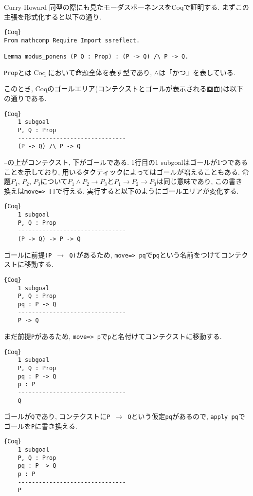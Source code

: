 \documentclass[11pt]{jsreport}
\theoremstyle{mystyle}
\newcommand{\0}{\textbf{0}}
\begin{document}
Curry-Howard 同型の際にも見たモーダスポーネンスをCoqで証明する. 
まずこの主張を形式化すると以下の通り. 
\begin{lstlisting}{Coq}
From mathcomp Require Import ssreflect.

Lemma modus_ponens (P Q : Prop) : (P -> Q) /\ P -> Q. \end{lstlisting}
{\tt Prop}とは Coq において命題全体を表す型であり, {\tt $\wedge$}は「かつ」を表している. 

このとき, Coqのゴールエリア(コンテクストとゴールが表示される画面)は以下の通りである. 
\begin{screen}
  \begin{lstlisting}{Coq}
    1 subgoal
    P, Q : Prop
    -------------------------------
    (P -> Q) /\ P -> Q \end{lstlisting}
\end{screen}
{\tt ---}の上がコンテクスト, 下がゴ－ルである. 1行目の{1 subgoal}はゴールが1つであることを示しており, 用いるタクティックによってはゴールが増えることもある. 
命題$P_1$, $P_2$, $P_3$について$P_1 \wedge P_2 \to P_3$と$P_1 \to P_2 \to P_3$は同じ意味であり, この書き換えは{\tt move=> []}で行える. 実行すると以下のようにゴールエリアが変化する. 
\begin{screen}
  \begin{lstlisting}{Coq}
    1 subgoal
    P, Q : Prop
    -------------------------------
    (P -> Q) -> P -> Q \end{lstlisting}
\end{screen}
ゴールに前提{\tt (P $\to$ Q)}があるため, {\tt move=> pq}で{\tt pq}という名前をつけてコンテクストに移動する. 
\begin{screen}
  \begin{lstlisting}{Coq}
    1 subgoal
    P, Q : Prop
    pq : P -> Q
    -------------------------------
    P -> Q \end{lstlisting}
\end{screen}
まだ前提{\tt P}があるため, {\tt move=> p}で{\tt p}と名付けてコンテクストに移動する. 
\begin{screen}
  \begin{lstlisting}{Coq}
    1 subgoal
    P, Q : Prop
    pq : P -> Q
    p : P
    -------------------------------
    Q \end{lstlisting}
\end{screen}
ゴールが{\tt Q}であり, コンテクストに{\tt P $\to$ Q}という仮定{\tt pq}があるので, {\tt apply pq}でゴールを{\tt P}に書き換える. 
\begin{screen}
  \begin{lstlisting}{Coq}
    1 subgoal
    P, Q : Prop
    pq : P -> Q
    p : P
    -------------------------------
    P \end{lstlisting}
\end{screen}
\end{document}
